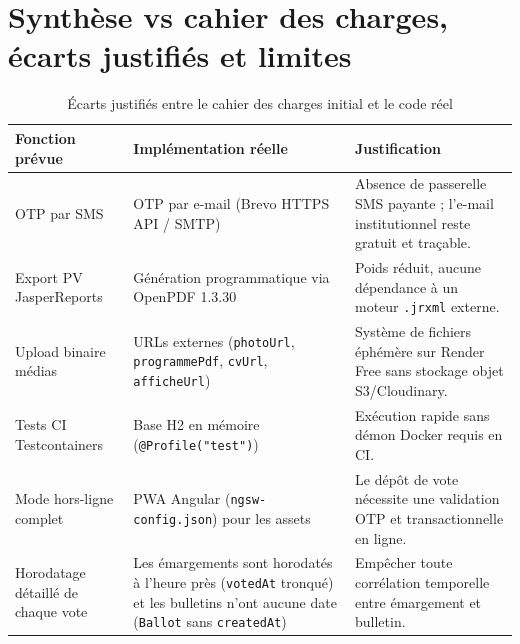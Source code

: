 \section{Synthèse vs cahier des charges, écarts justifiés et limites}

\begin{table}[H]
\centering
\caption{Écarts justifiés entre le cahier des charges initial et le code réel}
\label{tab:ecarts}
\small
\begin{tabularx}{\textwidth}{@{}lXX@{}}
\toprule
\rowcolor{uaszlight}
\textbf{Fonction prévue} & \textbf{Implémentation réelle} & \textbf{Justification} \\
\midrule
OTP par SMS & OTP par e-mail (Brevo HTTPS API / SMTP) & Absence de passerelle SMS payante ; l'e-mail institutionnel reste gratuit et traçable. \\
Export PV JasperReports & Génération programmatique via OpenPDF 1.3.30 & Poids réduit, aucune dépendance à un moteur \texttt{.jrxml} externe. \\
Upload binaire médias & URLs externes (\texttt{photoUrl}, \texttt{programmePdf}, \texttt{cvUrl}, \texttt{afficheUrl}) & Système de fichiers éphémère sur Render Free sans stockage objet S3/Cloudinary. \\
Tests CI Testcontainers & Base H2 en mémoire (\texttt{@Profile("test")}) & Exécution rapide sans démon Docker requis en CI. \\
Mode hors-ligne complet & PWA Angular (\texttt{ngsw-config.json}) pour les assets & Le dépôt de vote nécessite une validation OTP et transactionnelle en ligne. \\
Horodatage détaillé de chaque vote & Les émargements sont horodatés à l'heure près (\texttt{votedAt} tronqué) et les bulletins n'ont aucune date (\texttt{Ballot} sans \texttt{createdAt}) & Empêcher toute corrélation temporelle entre émargement et bulletin. \\
\bottomrule
\end{tabularx}
\end{table}
